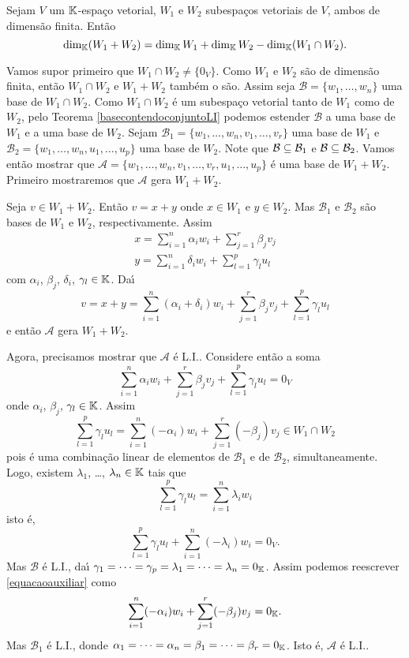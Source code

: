 \begin{proposicao}
	Sejam $V$ um $\mathbb{K}$-espa\c{c}o vetorial, $W_1$ e $W_2$ subespa\c{c}os vetoriais de $V$, ambos de dimens\~ao finita. Ent\~ao
	\[
		\dim_{\mathbb{K}}(W_1 + W_2) = \dim_{\mathbb{K}}W_1 + \dim_{\mathbb{K}}W_2 - \dim_{\mathbb{K}}(W_1 \cap W_2).
	\]
\end{proposicao}
\begin{prova}
	Vamos supor primeiro que $W_1 \cap W_2 \ne \{0_V\}$. Como $W_1$ e $W_2$ s\~ao de dimens\~ao finita, ent\~ao $W_1 \cap W_2$ e $W_1 + W_2$ tamb\'em o s\~ao. Assim seja $\mathcal{B} = \{w_1, \dots,w_n\}$ uma base de $W_1 \cap W_2$. Como $W_1 \cap W_2$ \'e um subespa\c{c}o vetorial tanto de $W_1$ como de $W_2$, pelo Teorema \ref{basecontendoconjuntoLI} podemos estender $\mathcal{B}$ a uma base de $W_1$ e a uma base de $W_2$. Sejam $\mathcal{B}_1 = \{w_1,\dots,w_n,v_1,\dots,v_r\}$ uma base de $W_1$ e $\mathcal{B}_2 = \{w_1,\dots,w_n,u_1,\dots,u_p\}$ uma base de $W_2$. Note que $\mathcal{B} \subseteq \mathcal{B}_1$ e $\mathcal{B} \subseteq \mathcal{B}_2$. Vamos ent\~ao mostrar que $\mathcal{A} = \{w_1,\dots,w_n,v_1,\dots,v_r,u_1,\dots,u_p\}$ \'e uma base de $W_1 + W_2$. Primeiro mostraremos que $\mathcal{A}$ gera $W_1 + W_2$.

	Seja $v \in W_1 + W_2$. Ent\~ao $v = x + y$ onde $x \in W_1$ e $y \in W_2$. Mas $\mathcal{B}_1$ e $\mathcal{B}_2$ s\~ao bases de $W_1$ e $W_2$, respectivamente. Assim
	\begin{align*}
		x = \sum_{i = 1}^n \alpha_i w_i + \sum_{j = 1}^r\beta_j v_j\\
		y = \sum_{i = 1}^n \delta_i w_i + \sum_{l = 1}^p\gamma_l u_l	
	\end{align*}
	com $\alpha_i$, $\beta_j$, $\delta_i$, $\gamma_l \in \mathbb{K}$. Da{\'\i}
	\[
		v = x + y = \sum_{i = 1}^n(\alpha_i + \delta_i)w_i + \sum_{j = 1}^r\beta_jv_j + \sum_{l = 1}^p\gamma_lu_l
	\]
	e ent\~ao $\mathcal{A}$ gera $W_1 + W_2$.

	Agora, precisamos mostrar que $\mathcal{A}$ \'e L.I.. Considere ent\~ao a soma
	\[
		\sum_{i = 1}^n\alpha_iw_i + \sum_{j = 1}^r\beta_jv_j + \sum_{l = 1}^p\gamma_lu_l = 0_V
	\]
	onde $\alpha_i$, $\beta_j$, $\gamma_l \in \mathbb{K}$. Assim
	\begin{equation}\label{equacaoauxiliar}
		\sum_{l = 1}^p\gamma_lu_l = \sum_{i = 1}^n(-\alpha_i)w_i + \sum_{j = 1}^r(-\beta_j)v_j \in W_1 \cap W_2
	\end{equation}
	pois \'e uma combina\c{c}\~ao linear de elementos de $\mathcal{B}_1$ e de $\mathcal{B}_2$, simultaneamente. Logo, existem $\lambda_1$, \dots, $\lambda_n \in \mathbb{K}$ tais que
	\[
		\sum_{l = 1}^p\gamma_lu_l = \sum_{i = 1}^n\lambda_iw_i
	\]
	isto \'e,
	\[
		\sum_{l = 1}^p\gamma_lu_l + \sum_{i = 1}^n(-\lambda_i)w_i = 0_V.
	\]
	Mas $\mathcal{B}$ \'e L.I., da{\'\i} $\gamma_1 = \cdots = \gamma_p = \lambda_1 = \cdots = \lambda_n = 0_{\mathbb{K}}$. Assim podemos reescrever \eqref{equacaoauxiliar} como
	\[
		\sum_{i = 1}^n(-\alpha_i)w_i + \sum_{j = 1}^r(-\beta_j)v_j = 0_{\mathbb{K}}.
	\]
	Mas $\mathcal{B}_1$ \'e L.I., donde $\alpha_1 = \cdots = \alpha_n = \beta_1 = \cdots = \beta_r = 0_{\mathbb{K}}$. Isto \'e, $\mathcal{A}$ \'e L.I..


\end{prova}
